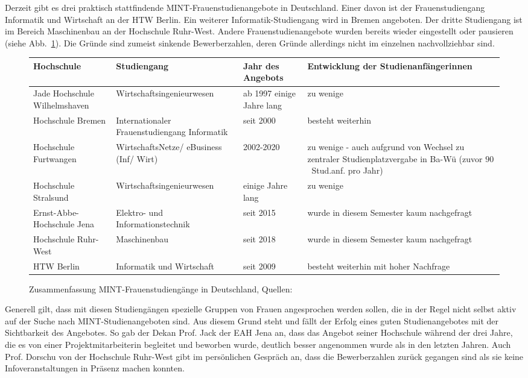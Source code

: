 \documentclass[a4paper, 12 pt]{IEEEtran}
\begin{document}
Derzeit gibt es drei praktisch stattfindende MINT-Frauenstudienangebote in Deutschland. Einer davon ist der Frauenstudiengang Informatik und Wirtschaft an der HTW Berlin. Ein weiterer Informatik-Studiengang wird in Bremen angeboten. Der dritte Studiengang ist im Bereich Maschinenbau an der Hochschule Ruhr-West.
Andere Frauenstudienangebote wurden bereits wieder eingestellt oder pausieren (siehe Abb.~\ref{tab:mintFSG}). Die Gründe sind zumeist sinkende Bewerberzahlen, deren Gründe allerdings nicht im einzelnen nachvollziehbar sind. 


\begin{figure}[!bt]
\centering
\begin{tabular}{ |p{3.0cm}||p{4.5cm}|p{3.5cm}|p{5cm}|  }
 \hline
 Hochschule                     & Studiengang   & Jahr des Angebots  & Entwicklung der Studienanfängerinnen\\
 \hline
 \hline
 Jade Hochschule Wil\-helms\-ha\-ven  & Wirtschafts\-inge\-ni\-eurwesen  & ab 1997 einige Jahre lang &   zu wenige\\\hline
Hochschule Bremen               & Internationaler Frauenstudiengang Informatik  & seit 2000   & besteht weiterhin\\\hline
 Hochschule Furt\-wang\-en      & WirtschaftsNetze/ eBusi\-ness (Inf/ Wirt) & 2002-2020 & zu wenige - auch aufgrund von Wechsel zu zentraler Studienplatzvergabe in Ba-Wü (zuvor $90$~Stud.anf. pro Jahr)\\\hline
 Hochschule Stralsund           & Wirtschafts\-inge\-ni\-eurwesen & einige Jahre lang & zu wenige\\\hline
 Ernst-Abbe-Hoch\-schule Jena   & Elektro- und Informationstechnik  & seit 2015 & wurde in diesem Semester kaum nachgefragt\\\hline
 Hochschule Ruhr-West& Maschinenbau  & seit 2018   & wurde in diesem Semester kaum nachgefragt\\\hline
 HTW Berlin & Informatik und Wirtschaft  & seit 2009 & besteht weiterhin mit hoher Nachfrage\\
 \hline
\end{tabular}
\caption{Zusammenfassung MINT-Frauenstudiengänge in Deutschland, Quellen: \cite{Degener.25.03.2021}\cite{Weidner.2022}}
\label{tab:mintFSG}
\end{figure}


Generell gilt, dass mit diesen Studiengängen spezielle Gruppen von Frauen angesprochen werden sollen, die in der Regel nicht selbst aktiv auf der Suche nach MINT-Studienangeboten sind. Aus diesem Grund steht und fällt der Erfolg eines guten Studienangebotes mit der Sichtbarkeit des Angebotes. So gab der Dekan Prof. Jack der EAH Jena an, dass das Angebot seiner Hochschule während der drei Jahre, die es von einer Projektmitarbeiterin begleitet und beworben wurde, deutlich besser angenommen wurde als in den letzten Jahren. Auch Prof. Dorschu von der Hochschule Ruhr-West gibt im persönlichen Gespräch an, dass die Bewerberzahlen zurück gegangen sind als sie keine Infoveranstaltungen in Präsenz machen konnten. 
\end{document}
